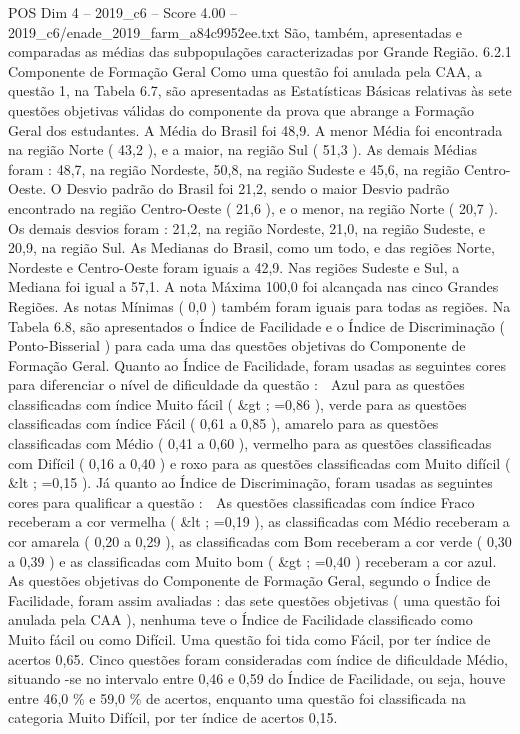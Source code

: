 \begin{textsample}{POS Dim 4 – 2019\_c6 – Score 4.00 – 2019\_c6/enade\_2019\_farm\_a84c9952ee.txt}
São, também, apresentadas e comparadas as médias das subpopulações caracterizadas por Grande Região. 6.2.1 Componente de Formação Geral Como uma questão foi anulada pela CAA, a questão 1, na Tabela 6.7, são apresentadas as Estatísticas Básicas relativas às sete questões objetivas válidas do componente da prova que abrange a Formação Geral dos estudantes.
A Média do Brasil foi 48,9.
A menor Média foi encontrada na região Norte ( 43,2 ), e a maior, na região Sul ( 51,3 ).
As demais Médias foram : 48,7, na região Nordeste, 50,8, na região Sudeste e 45,6, na região Centro-Oeste.
O Desvio padrão do Brasil foi 21,2, sendo o maior Desvio padrão encontrado na região Centro-Oeste ( 21,6 ), e o menor, na região Norte ( 20,7 ).
Os demais desvios foram : 21,2, na região Nordeste, 21,0, na região Sudeste, e 20,9, na região Sul.
As Medianas do Brasil, como um todo, e das regiões Norte, Nordeste e Centro-Oeste foram iguais a 42,9.
Nas regiões Sudeste e Sul, a Mediana foi igual a 57,1.
A nota Máxima 100,0 foi alcançada nas cinco Grandes Regiões.
As notas Mínimas ( 0,0 ) também foram iguais para todas as regiões.
Na Tabela 6.8, são apresentados o Índice de Facilidade e o Índice de Discriminação ( Ponto-Bisserial ) para cada uma das questões objetivas do Componente de Formação Geral.
Quanto ao Índice de Facilidade, foram usadas as seguintes cores para diferenciar o nível de dificuldade da questão :  Azul para as questões classificadas com índice Muito fácil ( \&gt ; =0,86 ), verde para as questões classificadas com índice Fácil ( 0,61 a 0,85 ), amarelo para as questões classificadas com Médio ( 0,41 a 0,60 ), vermelho para as questões classificadas com Difícil ( 0,16 a 0,40 ) e roxo para as questões classificadas com Muito difícil ( \&lt ; =0,15 ).
Já quanto ao Índice de Discriminação, foram usadas as seguintes cores para qualificar a questão :  As questões classificadas com índice Fraco receberam a cor vermelha ( \&lt ; =0,19 ), as classificadas com Médio receberam a cor amarela ( 0,20 a 0,29 ), as classificadas com Bom receberam a cor verde ( 0,30 a 0,39 ) e as classificadas com Muito bom ( \&gt ; =0,40 ) receberam a cor azul.
As questões objetivas do Componente de Formação Geral, segundo o Índice de Facilidade, foram assim avaliadas : das sete questões objetivas ( uma questão foi anulada pela CAA ), nenhuma teve o Índice de Facilidade classificado como Muito fácil ou como Difícil.
Uma questão foi tida como Fácil, por ter índice de acertos 0,65.
Cinco questões foram consideradas com índice de dificuldade Médio, situando -se no intervalo entre 0,46 e 0,59 do Índice de Facilidade, ou seja, houve entre 46,0 \% e 59,0 \% de acertos, enquanto uma questão foi classificada na categoria Muito Difícil, por ter índice de acertos 0,15.

\end{textsample}
